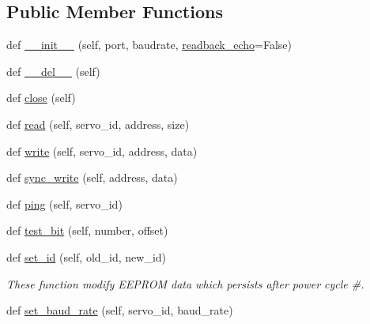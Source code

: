 \subsection*{Public Member Functions}
\begin{DoxyCompactItemize}
\item 
def \hyperlink{classdynamixel__driver_1_1dynamixel__io_1_1_dynamixel_i_o_ab9c6aee22734b7c0a09a4f1e5a03609b}{\+\_\+\+\_\+init\+\_\+\+\_\+} (self, port, baudrate, \hyperlink{classdynamixel__driver_1_1dynamixel__io_1_1_dynamixel_i_o_a5cc6e8617f26fe6af8add33bee3544fe}{readback\+\_\+echo}=False)
\item 
def \hyperlink{classdynamixel__driver_1_1dynamixel__io_1_1_dynamixel_i_o_a2a13aea3e96f34e02926c4395924359e}{\+\_\+\+\_\+del\+\_\+\+\_\+} (self)
\item 
def \hyperlink{classdynamixel__driver_1_1dynamixel__io_1_1_dynamixel_i_o_a4cdcd3496e76197fc4d5f23ccd7daf26}{close} (self)
\item 
def \hyperlink{classdynamixel__driver_1_1dynamixel__io_1_1_dynamixel_i_o_a6f8abf6563aac5aed93565234b971314}{read} (self, servo\+\_\+id, address, size)
\item 
def \hyperlink{classdynamixel__driver_1_1dynamixel__io_1_1_dynamixel_i_o_a32049f3a322d37054032b9d44be39192}{write} (self, servo\+\_\+id, address, data)
\item 
def \hyperlink{classdynamixel__driver_1_1dynamixel__io_1_1_dynamixel_i_o_aa61b3e4c17b04db3e5fa94f4f81a961d}{sync\+\_\+write} (self, address, data)
\item 
def \hyperlink{classdynamixel__driver_1_1dynamixel__io_1_1_dynamixel_i_o_a6a992742790d35953761eeb20275563a}{ping} (self, servo\+\_\+id)
\item 
def \hyperlink{classdynamixel__driver_1_1dynamixel__io_1_1_dynamixel_i_o_ac617d4150cfc51f64cde863cc5902a8f}{test\+\_\+bit} (self, number, offset)
\item 
def \hyperlink{classdynamixel__driver_1_1dynamixel__io_1_1_dynamixel_i_o_afccabc02484af88d2343715225d92194}{set\+\_\+id} (self, old\+\_\+id, new\+\_\+id)
\begin{DoxyCompactList}\small\item\em These function modify E\+E\+P\+R\+OM data which persists after power cycle \#. \end{DoxyCompactList}\item 
def \hyperlink{classdynamixel__driver_1_1dynamixel__io_1_1_dynamixel_i_o_aec6d930e6e2e4e0063d555ff79f6838e}{set\+\_\+baud\+\_\+rate} (self, servo\+\_\+id, baud\+\_\+rate)

\end{DoxyCompactItemize}
